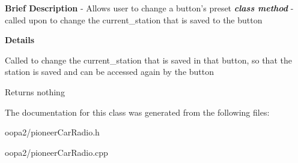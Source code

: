 {\bfseries Brief Description} -\/ Allows user to change a button's preset {\bfseries {\itshape class method}} -\/ called upon to change the current\-\_\-station that is saved to the button 

{\bfseries Details}

Called to change the current\-\_\-station that is saved in that button, so that the station is saved and can be accessed again by the button

\begin{DoxyReturn}{Returns}
nothing 
\end{DoxyReturn}


The documentation for this class was generated from the following files\-:\begin{DoxyCompactItemize}
\item 
oopa2/pioneer\-Car\-Radio.\-h\item 
oopa2/pioneer\-Car\-Radio.\-cpp\end{DoxyCompactItemize}
